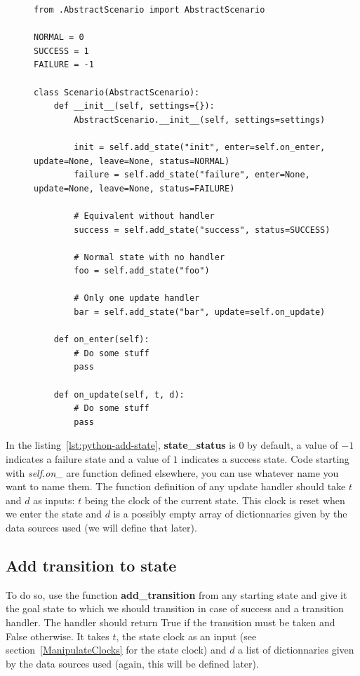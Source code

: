 \documentclass[12pt]{article}
\theoremstyle{definition}
\theoremstyle{definition}
\theoremstyle{remark}
\begin{document}
\begin{figure}[H]
    \begin{lstlisting}[caption="Various usage of self.add\_state",label={lst:python-add-state-examples}]
from .AbstractScenario import AbstractScenario

NORMAL = 0
SUCCESS = 1
FAILURE = -1

class Scenario(AbstractScenario):
    def __init__(self, settings={}):
        AbstractScenario.__init__(self, settings=settings)

        init = self.add_state("init", enter=self.on_enter, update=None, leave=None, status=NORMAL)
        failure = self.add_state("failure", enter=None, update=None, leave=None, status=FAILURE)

        # Equivalent without handler
        success = self.add_state("success", status=SUCCESS)

        # Normal state with no handler
        foo = self.add_state("foo")

        # Only one update handler
        bar = self.add_state("bar", update=self.on_update)

    def on_enter(self):
        # Do some stuff
        pass

    def on_update(self, t, d):
        # Do some stuff
        pass
    \end{lstlisting}
\end{figure}

In the listing~\ref{lst:python-add-state}, \textbf{state\_status} is $0$ by default, a value of $-1$ indicates a failure state and a value of $1$ indicates a success state. Code starting with \textit{self.on\_} are function defined elsewhere, you can use whatever name you want to name them. The function definition of any update handler should take $t$ and $d$ as inputs: $t$ being the clock of the current state. This clock is reset when we enter the state and $d$ is a possibly empty array of dictionnaries given by the data sources used (we will define that later).



\subsection{Add transition to state}

To do so, use the function \textbf{add\_transition} from any starting state and give it the goal state to which we should transition in case of success and a transition handler. The handler should return True if the transition must be taken and False otherwise. It takes $t$, the state clock as an input (see section~\ref{ManipulateClocks} for the state clock) and $d$ a list of dictionnaries given by the data sources used (again, this will be defined later).
\end{document}
